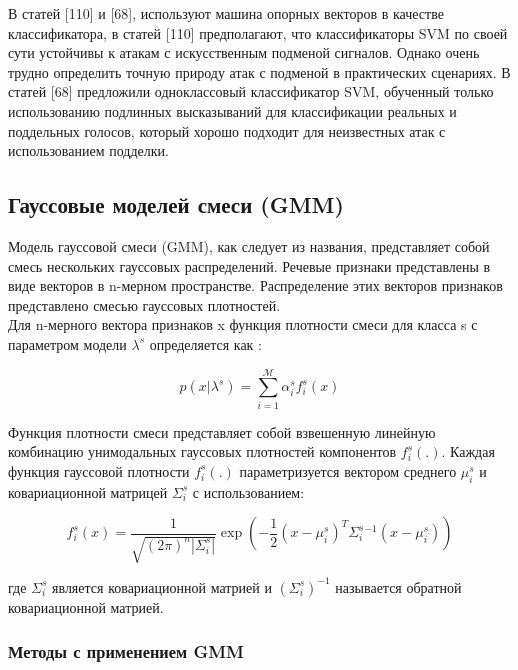 В статей [110] и [68], используют машина опорных векторов в качестве классификатора, в статей [110] предполагают, что классификаторы SVM по своей сути устойчивы к атакам с искусственным подменой сигналов. Однако очень трудно определить точную природу атак с подменой в практических сценариях.
В статей [68] предложили одноклассовый классификатор SVM, обученный только использованию подлинных высказываний для классификации реальных и поддельных голосов, который хорошо подходит для неизвестных атак с использованием подделки.

\subsection{Гауссовые моделей смеси (GMM)}

Модель гауссовой смеси (GMM), как следует из названия, представляет собой смесь нескольких гауссовых распределений. Речевые признаки представлены в виде векторов в n-мерном пространстве. Распределение этих векторов признаков представлено смесью гауссовых плотностей. \\ Для n-мерного вектора признаков x функция плотности смеси для класса s с параметром модели \(\lambda^{s}\) определяется как \cite{JOTHILAKSHMI2016301}:

\begin{equation}
    p(x | \lambda^{s}) = \sum_{i = 1}^{\mathcal{M}} \alpha^{s}_{i} f_{i}^{s}(x)
\end{equation}

Функция плотности смеси представляет собой взвешенную линейную комбинацию  унимодальных гауссовых плотностей компонентов \(f_ {i}^{s}(.)\). Каждая функция гауссовой плотности \(f_{i}^{s}(.)\) параметризуется вектором среднего \(\mu_{i}^{s}\) и ковариационной матрицей \(\Sigma_{i}^{s}\) с использованием:

\begin{equation}
    f_{i}^{s}(x) = \frac{1}{\sqrt{(2\pi)^{n}|\Sigma_{i}^{s}|}} \exp \left(-\frac{1}{2}(x - \mu_{i}^{s})^T \Sigma_{i}^{s}^{-1} (x - \mu_{i}^{s})\right)
\end{equation}

где \(\Sigma_{i}^{s}\) является ковариационной матрией и \((\Sigma_{i}^{s})^{-1}\) называется обратной ковариационной матрией.

\subsubsection*{Методы с применением GMM}

